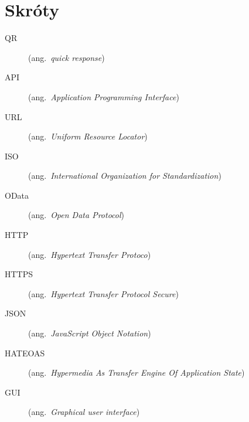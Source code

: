 \chapter*{Skróty}\mbox{}
\label{sec:skroty}
\noindent
\begin{description}
  \item [QR] (ang.\ \emph{quick response})
  \item [API] (ang.\ \emph{Application Programming Interface})
  \item [URL] (ang.\ \emph{Uniform Resource Locator})
  \item [ISO] (ang.\ \emph{International Organization for Standardization})
  \item [OData] (ang.\ \emph{Open Data Protocol})
  \item [HTTP] (ang.\ \emph{Hypertext Transfer Protoco})
  \item [HTTPS] (ang.\ \emph{Hypertext Transfer Protocol Secure})
  \item [JSON] (ang.\ \emph{JavaScript Object Notation})
  \item [HATEOAS] (ang.\ \emph{Hypermedia As Transfer Engine Of Application State})
  \item [GUI] (ang.\ \emph{Graphical user interface})
\end{description}
